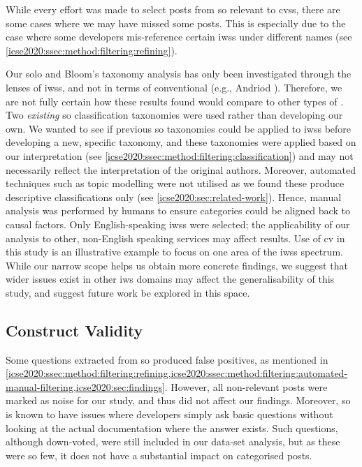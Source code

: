 While every effort was made to select posts from \gls{so} relevant to \glspl{cvs}, there are some cases where we may have missed some posts. This is especially due to the case where some developers mis-reference certain \glspl{iws} under different names (see \cref{icse2020:ssec:method:filtering:refining}).

%
Our \gls{solo} and Bloom's taxonomy analysis has only been investigated through the lenses of \glspl{iws}, and not in terms of conventional  (e.g., Andriod ). Therefore, we are not fully certain how these results found would compare to other types of . %
%
Two \textit{existing} \gls{so} classification taxonomies were used rather than developing our own. We wanted to see if previous \gls{so} taxonomies could be applied to \glspl{iws} before developing a new, specific taxonomy, and these taxonomies were applied based on our interpretation  (see \cref{icse2020:ssec:method:filtering:classification}) and may not necessarily reflect the interpretation of the original authors. Moreover, automated techniques such as topic modelling were not utilised as we found these produce descriptive classifications only (see \cref{icse2020:sec:related-work}). Hence, manual analysis was performed by humans to ensure categories could be aligned back to causal factors.
%
Only English-speaking \glspl{iws} were selected; the applicability of our analysis to other, non-English speaking services may affect results.
%
Use of \gls{cv} in this study is an illustrative example to focus on one area of the \glspl{iws} spectrum. While our narrow scope helps us obtain more concrete findings, we suggest that wider issues exist in other \gls{iws} domains may affect the generalisability of this study, and suggest future work be explored in this space.

\subsection{Construct Validity}

Some questions extracted from \gls{so} produced false positives, as mentioned in \cref{icse2020:ssec:method:filtering:refining,icse2020:ssec:method:filtering:automated-manual-filtering,icse2020:sec:findings}. However, all non-relevant posts were marked as noise for our study, and thus did not affect our findings.
%
Moreover, \gls{so} is known to have issues where developers simply ask basic questions without looking at the actual documentation where the answer exists. Such questions, although down-voted, were still included in our data-set analysis, but as these were \gls{so} few, it does not have a substantial impact on categorised posts.

